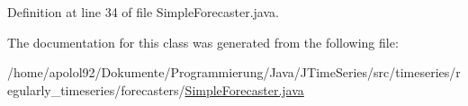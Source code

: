 Definition at line 34 of file Simple\+Forecaster.\+java.



The documentation for this class was generated from the following file\+:\begin{DoxyCompactItemize}
\item 
/home/apolol92/\+Dokumente/\+Programmierung/\+Java/\+J\+Time\+Series/src/timeseries/regularly\+\_\+timeseries/forecasters/\hyperlink{_simple_forecaster_8java}{Simple\+Forecaster.\+java}\end{DoxyCompactItemize}
